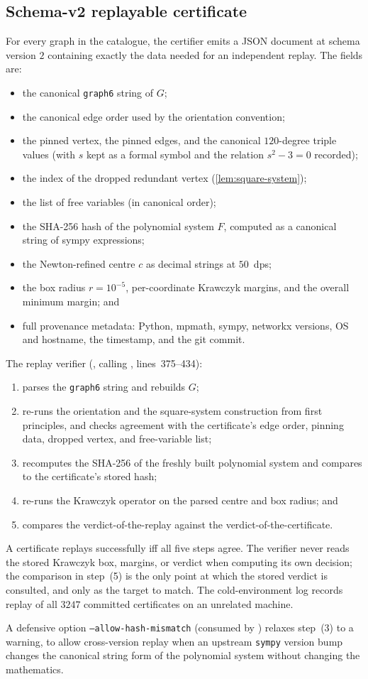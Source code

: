 \subsection{Schema-v2 replayable certificate}
\label{sec:certification-replay}

For every graph in the catalogue, the certifier emits a JSON document
at schema version $2$ containing exactly the data needed for an
independent replay. The fields are:
\begin{itemize}
  \item the canonical \texttt{graph6} string of $G$;
  \item the canonical edge order used by the orientation convention;
  \item the pinned vertex, the pinned edges, and the canonical
        $120$-degree triple values (with $s$ kept as a formal symbol
        and the relation $s^{2} - 3 = 0$ recorded);
  \item the index of the dropped redundant vertex
        (\cref{lem:square-system});
  \item the list of free variables (in canonical order);
  \item the SHA-256 hash of the polynomial system $F$, computed as a
        canonical string of sympy expressions;
  \item the Newton-refined centre $c$ as decimal strings at $50$~dps;
  \item the box radius $r = 10^{-5}$, per-coordinate Krawczyk
        margins, and the overall minimum margin; and
  \item full provenance metadata: Python, mpmath, sympy, networkx
        versions, OS and hostname, the timestamp, and the git commit.
\end{itemize}
The replay verifier
(, calling
, lines~375--434):
\begin{enumerate}[label=(\arabic*)]
  \item parses the \texttt{graph6} string and rebuilds $G$;
  \item re-runs the orientation and the square-system construction
        from first principles, and checks agreement with the
        certificate's edge order, pinning data, dropped vertex, and
        free-variable list;
  \item recomputes the SHA-256 of the freshly built polynomial
        system and compares to the certificate's stored hash;
  \item re-runs the Krawczyk operator on the parsed centre and box
        radius; and
  \item compares the verdict-of-the-replay against the
        verdict-of-the-certificate.
\end{enumerate}
A certificate replays successfully iff all five steps agree. The
verifier never reads the stored Krawczyk box, margins, or verdict
when computing its own decision; the comparison in step~(5) is the
only point at which the stored verdict is consulted, and only as the
target to match. The cold-environment log
 records replay of all $3247$ committed
certificates on an unrelated machine.

A defensive option \texttt{--allow-hash-mismatch} (consumed by
) relaxes step~(3) to a warning, to
allow cross-version replay when an upstream \texttt{sympy} version
bump changes the canonical string form of the polynomial system
without changing the mathematics.
